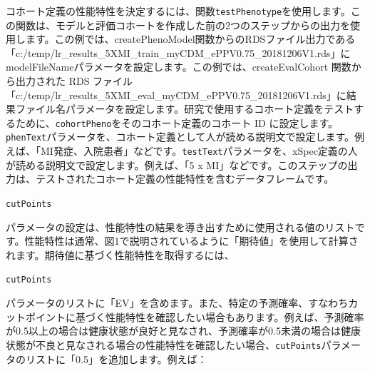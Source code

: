 \documentclass[
  11pt]{book}
\theoremstyle{definition}
\theoremstyle{definition}
\theoremstyle{definition}
\theoremstyle{definition}
\theoremstyle{remark}
\begin{document}
コホート定義の性能特性を決定するには、関数\texttt{testPhenotype}を使用します。この関数は、モデルと評価コホートを作成した前の2つのステップからの出力を使用します。この例では、createPhenoModel関数からのRDSファイル出力である「c:/temp/lr\_results\_5XMI\_train\_myCDM\_ePPV0.75\_20181206V1.rds」にmodelFileNameパラメータを設定します。この例では、createEvalCohort 関数から出力された RDS ファイル「c:/temp/lr\_results\_5XMI\_eval\_myCDM\_ePPV0.75\_20181206V1.rds」に結果ファイル名パラメータを設定します。研究で使用するコホート定義をテストするために、\texttt{cohortPheno}をそのコホート定義のコホート ID に設定します。\texttt{phenText}パラメータを、コホート定義として人が読める説明文で設定します。例えば、「MI発症、入院患者」などです。\texttt{testText}パラメータを、xSpec定義の人が読める説明文で設定します。例えば、「5 x MI」などです。このステップの出力は、テストされたコホート定義の性能特性を含むデータフレームです。

\texttt{cutPoints}

パラメータの設定は、性能特性の結果を導き出すために使用される値のリストです。性能特性は通常、図1で説明されているように「期待値」を使用して計算されます。期待値に基づく性能特性を取得するには、

\texttt{cutPoints}

パラメータのリストに「EV」を含めます。また、特定の予測確率、すなわちカットポイントに基づく性能特性を確認したい場合もあります。例えば、予測確率が0.5以上の場合は健康状態が良好と見なされ、予測確率が0.5未満の場合は健康状態が不良と見なされる場合の性能特性を確認したい場合、\texttt{cutPoints}パラメータのリストに「0.5」を追加します。例えば：
\end{document}
